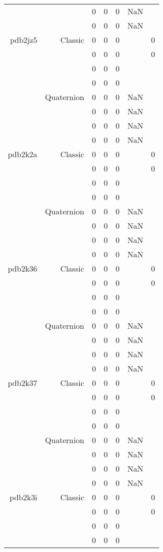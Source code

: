 \begin{xltabular}{\textwidth}{r|rcccSc}
& & 0 & 0 & 0 & NaN & \\
& & 0 & 0 & 0 & NaN & \\ \addlinespace
pdb2jz5 & Classic & 0 & 0 & 0 & & 0 \\
& & 0 & 0 & 0 & & 0 \\
& & 0 & 0 & 0 & & \\
& & 0 & 0 & 0 & & \\
& Quaternion & 0 & 0 & 0 & NaN & \\
& & 0 & 0 & 0 & NaN & \\
& & 0 & 0 & 0 & NaN & \\
& & 0 & 0 & 0 & NaN & \\ \addlinespace
pdb2k2a & Classic & 0 & 0 & 0 & & 0 \\
& & 0 & 0 & 0 & & 0 \\
& & 0 & 0 & 0 & & \\
& & 0 & 0 & 0 & & \\
& Quaternion & 0 & 0 & 0 & NaN & \\
& & 0 & 0 & 0 & NaN & \\
& & 0 & 0 & 0 & NaN & \\
& & 0 & 0 & 0 & NaN & \\ \addlinespace
pdb2k36 & Classic & 0 & 0 & 0 & & 0 \\
& & 0 & 0 & 0 & & 0 \\
& & 0 & 0 & 0 & & \\
& & 0 & 0 & 0 & & \\
& Quaternion & 0 & 0 & 0 & NaN & \\
& & 0 & 0 & 0 & NaN & \\
& & 0 & 0 & 0 & NaN & \\
& & 0 & 0 & 0 & NaN & \\ \addlinespace
pdb2k37 & Classic & 0 & 0 & 0 & & 0 \\
& & 0 & 0 & 0 & & 0 \\
& & 0 & 0 & 0 & & \\
& & 0 & 0 & 0 & & \\
& Quaternion & 0 & 0 & 0 & NaN & \\
& & 0 & 0 & 0 & NaN & \\
& & 0 & 0 & 0 & NaN & \\
& & 0 & 0 & 0 & NaN & \\ \addlinespace
pdb2k3i & Classic & 0 & 0 & 0 & & 0 \\
& & 0 & 0 & 0 & & 0 \\
& & 0 & 0 & 0 & & \\
& & 0 & 0 & 0 & & \\

\end{xltabular}
